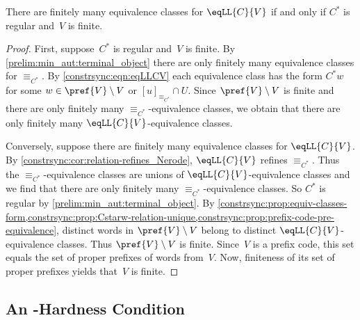 \begin{proposition} \label{constrsync:prop:eqCV-finite-index}
There are finitely many equivalence classes for $\eqLL{C}{V}$ if and only if $C^*$ is regular
and~$V$ is finite. 
\end{proposition}
\begin{proof}
	First, suppose~$C^*$ is regular and~$V$ is finite.
	By \cref{prelim:min_aut:terminal_object} 
	there are only finitely many equivalence classes for $\equiv_{C^*}$.
	By \cref{constrsync:eqn:eqLLCV}
	each equivalence class has the form $C^*w$
	for some $w \in \pref{V}\setminus V$
	or $[u]_{\equiv_{C^*}} \cap U$.
	Since $\pref{V}\setminus V$ is finite
	and there are only finitely many $\equiv_{C^*}$-equivalence
	classes, we obtain that there are only
	finitely many $\eqLL{C}{V}$-equivalence classes.
	
	Conversely, suppose there are finitely many equivalence classes for $\eqLL{C}{V}$.
	By \cref{constrsync:cor:relation-refines_Nerode}, 
	$\eqLL{C}{V}$ refines $\equiv_{C^*}$.
	Thus the $\equiv_{C^*}$-equivalence classes
	are unions of $\eqLL{C}{V}$-equivalence classes
	and we find that there are only finitely
	many $\equiv_{C^*}$-equivalence classes.
	So $C^*$ is regular by \cref{prelim:min_aut:terminal_object}.
	By \cref{constrsync:prop:equiv-classes-form,constrsync:prop:Cstarw-relation-unique,constrsync:prop:prefix-code-pre-equivalence},
	distinct words in $\pref{V}\setminus V$ belong to distinct $\eqLL{C}{V}$-equivalence classes.
	Thus $\pref{V}\setminus V$ is finite.
	Since~$V$ is a prefix code, this set equals the set of proper prefixes of words from~$V$.
	Now, finiteness of its set of proper prefixes yields that~$V$ is finite.
\end{proof}

\subsection{An \NL-Hardness Condition}
\label{constr_sync:sec:NL-hardness}

